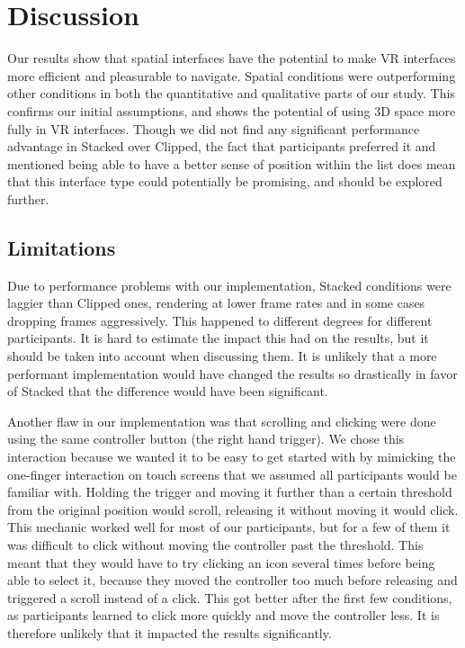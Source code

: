 \documentclass[nobib]{tufte-book} %
\begin{document}
\chapter{Discussion}
\label{ch:discussion}

Our results show that spatial interfaces have the potential to make VR interfaces more efficient and pleasurable to navigate. Spatial conditions were outperforming other conditions in both the quantitative and qualitative parts of our study. This confirms our initial assumptions, and shows the potential of using 3D space more fully in VR interfaces. Though we did not find any significant performance advantage in Stacked over Clipped, the fact that participants preferred it and mentioned being able to have a better sense of position within the list does mean that this interface type could potentially be promising, and should be explored further.

\section{Limitations}
Due to performance problems with our implementation, Stacked conditions were laggier than Clipped ones, rendering at lower frame rates and in some cases dropping frames aggressively. This happened to different degrees for different participants. It is hard to estimate the impact this had on the results, but it should be taken into account when discussing them. It is unlikely that a more performant implementation would have changed the results so drastically in favor of Stacked that the difference would have been significant.

Another flaw in our implementation was that scrolling and clicking were done using the same controller button (the right hand trigger). We chose this interaction because we wanted it to be easy to get started with by mimicking the one-finger interaction on touch screens that we assumed all participants would be familiar with. Holding the trigger and moving it further than a certain threshold from the original position would scroll, releasing it without moving it would click. This mechanic worked well for most of our participants, but for a few of them it was difficult to click without moving the controller past the threshold. This meant that they would have to try clicking an icon several times before being able to select it, because they moved the controller too much before releasing and triggered a scroll instead of a click. This got better after the first few conditions, as participants learned to click more quickly and move the controller less. It is therefore unlikely that it impacted the results significantly.
\end{document}

